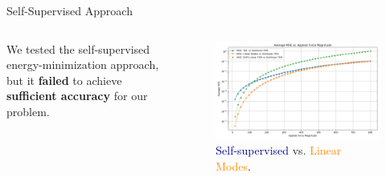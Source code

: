 \documentclass{beamer}
\begin{document}
\begin{frame}{Self-Supervised Approach}
    \begin{columns}[T]
        \begin{column}{0.4\textwidth}
            We tested the self-supervised energy-minimization approach, but it \textbf{failed} to achieve \textbf{sufficient accuracy} for our {problem}.         
    
        \end{column}
        
        \begin{column}{0.6\textwidth}
            \begin{figure}
                \includegraphics[width=\textwidth]{Images/self_supervised_mse.png}
                                \caption{\textcolor{darkblue}{Self-supervised} vs. \textcolor{darkorange}{Linear Modes}.}
            \end{figure}
        \end{column}
    \end{columns}
\end{frame}
\end{document}
